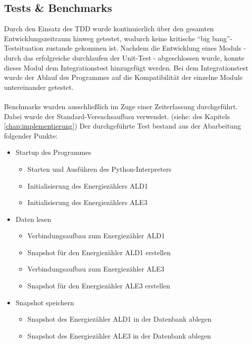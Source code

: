 \documentclass[Bachelorarbeit.tex]{subfiles}
\begin{document}
\subsection{Tests \& Benchmarks}
\label{subsec:tests_benchmark}
Durch den Einsatz des \ac{TDD} wurde kontinuierlich über den gesamten Entwicklungszeitraum hinweg getestet, wodurch keine kritische "`big bang"'-Testsituation zustande gekommen ist. 
Nachdem die Entwicklung eines Moduls - durch das erfolgreiche durchlaufen der Unit-Test - abgeschlossen wurde, konnte dieses Modul dem Integrationstest hinzugefügt werden. Bei dem Integrationstest wurde der Ablauf des Programmes auf die Kompatibilität der einzelne Module untereinander getestet.\\
\\
Benchmarks wurden ausschließlich im Zuge einer Zeiterfassung durchgeführt. Dabei wurde der Standard-Versuchsaufbau verwendet. (siehe:  des Kapitels \ref{chap:implementierung}) Der durchgeführte Test bestand aus der Abarbeitung folgender Punkte:
\begin{itemize}
\item Startup des Programmes
\begin{itemize}
\item Starten und Ausführen des Python-Interpreters
\item Initialisierung des Energiezählers \acs{ALD1}
\item Initialisierung des Energiezählers \acs{ALE3}
\end{itemize}
%
\item Daten lesen
\begin{itemize}
\item Verbindungsaufbau zum Energiezähler \acs{ALD1}
\item Snapshot für den Energiezähler \acs{ALD1} erstellen
\item Verbindungsaufbau zum Energiezähler \acs{ALE3}
\item Snapshot für den Energiezähler \acs{ALE3} erstellen
\end{itemize}
%
\item Snapshot speichern
\begin{itemize}
\item Snapshot des Energiezähler \acs{ALD1} in der Datenbank ablegen
\item Snapshot des Energiezähler \acs{ALE3} in der Datenbank ablegen
\end{itemize}
%
\end{itemize}
\end{document}
